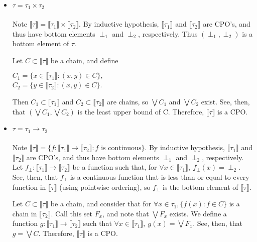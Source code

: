 \documentclass{westhesis}
\begin{document}
\begin{itemize}
\item $\tau = \tau_1 \times \tau_2$ \\ \\
Note $\llbracket \tau \rrbracket = \llbracket \tau_1 \rrbracket \times \llbracket \tau_2 \rrbracket$. By inductive hypothesis,
$\llbracket \tau_1 \rrbracket$ and $\llbracket \tau_2 \rrbracket$ are CPO's, and thus have bottom elements $\perp_1$ and $
\perp_2$, respectively. Thus $(\perp_1, \perp_2)$ is a bottom element of $\tau$. 

Let $C \subset \llbracket \tau \rrbracket$ be a
chain, and define
\begin{center}
$C_1 = \{x \in \llbracket \tau_1 \rrbracket : (x,y) \in C\},$ \\
$C_2 = \{ y \in \llbracket \tau_2 \rrbracket: (x,y) \in C\}$. \\ 
\end{center}
Then $C_1 \subset \llbracket \tau_1 \rrbracket$ and $C_2 \subset \llbracket \tau_2 \rrbracket$ are chains, so $\bigvee C_1$
and $\bigvee C_2$ exist. See, then, that $(\bigvee C_1, \bigvee C_2)$ is the least upper bound of C. Therefore, $\llbracket 
\tau \rrbracket$ is a CPO.
\item $\tau = \tau_1 \rightarrow \tau_2$ \\ \\
Note $\llbracket \tau \rrbracket = \{f : \llbracket \tau_1 \rrbracket \rightarrow \llbracket \tau_2 \rrbracket : f \text{ is continuous}\}
$. By inductive hypothesis, $\llbracket \tau_1 \rrbracket$ and $\llbracket \tau_2 \rrbracket$ are CPO's, and thus have bottom
elements $\perp_1$ and $\perp_2$, respectively. Let $f_{\perp}: \llbracket \tau_1 \rrbracket \rightarrow \llbracket \tau_2 
\rrbracket$ be a function such that, for $\forall x \in \llbracket \tau_1 \rrbracket, \ f_{\perp}(x) = \perp_2$. See, then, that 
$f_{\perp}$ is a continuous function that is less than or equal to every function in $\llbracket \tau \rrbracket$ (using pointwise
ordering), so $f_{\perp}$ is the bottom element of $\llbracket \tau \rrbracket$.  

Let $C \subset \llbracket \tau \rrbracket$ be a 
chain, and consider that for $\forall x \in \tau_1, \{f(x) : f \in C\}$ is a chain in $\llbracket \tau_2 \rrbracket$. Call this set $F_x$,
and note that $\bigvee F_x$ exists. We define a function $g: \llbracket \tau_1 \rrbracket \rightarrow \llbracket \tau_2 \rrbracket$ 
such that $\forall x \in \llbracket \tau_1 \rrbracket, \ g(x) = \bigvee F_x$. See, then, that $g = \bigvee C$. Therefore, $\llbracket
\tau \rrbracket$ is a CPO.
\end{itemize}
\end{document}
